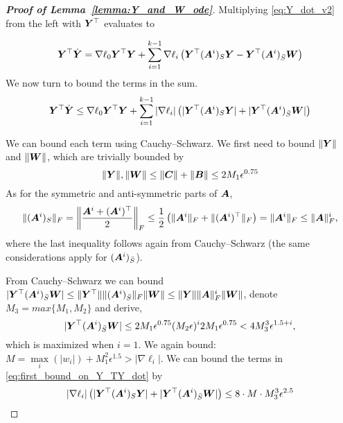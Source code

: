 \begin{proof}[\textbf{Proof of Lemma~\ref{lemma:Y_and_W_ode}}]
Multiplying \eqref{eq:Y_dot_v2} from the left with ${\bm{Y}}^\top$ evaluates to

\begin{equation}
    {\bm{Y}}^\top\dot{{\bm{Y}}} = \nabla\ell_0 {\bm{Y}}^\top {\bm{Y}} +\sum_{i=1}^{k-1}\nabla\ell_i\left({\bm{Y}}^\top({\bm{A}}^i)_S{\bm{Y}} - {\bm{Y}}^\top({\bm{A}}^i)_{\bar{S}}{\bm{W}}\right)
\end{equation}
We now turn to bound the terms in the sum. 
\begin{equation}\label{eq:first_bound_on_Y_TY_dot}
    {\bm{Y}}^\top\dot{{\bm{Y}}} \le \nabla\ell_0 {\bm{Y}}^\top {\bm{Y}} +\sum_{i=1}^{k-1}|\nabla\ell_i|\left(|{\bm{Y}}^\top({\bm{A}}^i)_S{\bm{Y}}| + |{\bm{Y}}^\top({\bm{A}}^i)_{\bar{S}}{\bm{W}}|\right)
\end{equation}

We can bound each term using Cauchy–Schwarz. We first need to bound $\|{\bm{Y}}\|$ and $\|{\bm{W}}\|$, which are trivially bounded by 
\begin{equation}
    \|{\bm{Y}}\|,\|{\bm{W}}\|\le \|{\bm{C}}\|+\|{\bm{B}}\|\le 2M_1\epsilon^{0.75}
\end{equation}
As for the symmetric and anti-symmetric parts of ${\bm{A}}$,
\begin{equation}\label{eq:bound_singular_of_A_sym_and_asym}
    \|({\bm{A}}^i)_S\|_F=\left\|\frac{{\bm{A}}^i+({\bm{A}}^i)^\top}{2}\right\|_F \le \frac{1}{2}\left(\|{\bm{A}}^i\|_F+\|({\bm{A}}^i)^\top\|_F\right)=\|{\bm{A}}^i\|_F\le \|{\bm{A}}\|_F^i,
\end{equation}
where the last inequality follows again from Cauchy–Schwarz (the same considerations apply for $({\bm{A}}^i)_{\bar{S}}$).

From Cauchy–Schwarz we can bound $|{\bm{Y}}^\top({\bm{A}}^i)_{\bar{S}}{\bm{W}}|\le \|{\bm{Y}}^\top\|\|({\bm{A}}^i)_{\bar{S}}\|_F\|{\bm{W}}\| \le \|{\bm{Y}}\|\|{\bm{A}}\|_F^i\|{\bm{W}}\|$, denote $M_3 = max\lbrace M_1, M_2\rbrace$ and derive,
\begin{equation}\label{eq:cauchy_schwarz_bound}
    |{\bm{Y}}^\top({\bm{A}}^i)_{\bar{S}}{\bm{W}}| \le 2M_1\epsilon^{0.75}(M_2\epsilon)^i2M_1\epsilon^{0.75}< 4M_3^3 \epsilon^{1.5+i},
\end{equation}
%
which is maximized when $i=1$. We again bound:
$M = \underset{i}{\max}(|w_i|)+M_1^2\epsilon^{1.5}>|\nabla \ell_i|$. We can bound the terms in \eqref{eq:first_bound_on_Y_TY_dot} by 
\begin{equation}
    |\nabla\ell_i|\left(|{\bm{Y}}^\top({\bm{A}}^i)_S{\bm{Y}}| + |{\bm{Y}}^\top({\bm{A}}^i)_{\bar{S}}{\bm{W}}|\right)\le 8\cdot M \cdot  M_3^3\epsilon^{2.5}
\end{equation}


\end{proof}
